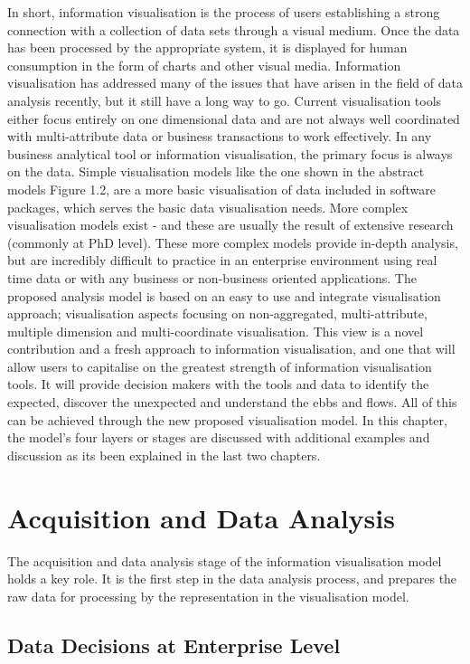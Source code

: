In short, information visualisation is the process of users establishing a strong connection with a collection of data sets through a visual medium. Once the data has been processed by the appropriate system, it is displayed for human consumption in the form of charts and other visual media. Information visualisation has addressed many of the issues that have arisen in the field of data analysis recently, but it still have a long way to go. Current visualisation tools either focus entirely on one dimensional data and are not always well coordinated with multi-attribute data or business transactions to  work effectively. In any business analytical tool or information visualisation, the primary focus is always on the data. Simple visualisation models like the one shown in the abstract models Figure 1.2, are a more basic visualisation of data included in software packages, which serves the basic data visualisation needs. More complex visualisation models exist - and these are usually the result of extensive research (commonly at PhD level). These more complex models provide in-depth analysis, but are incredibly difficult to practice in an enterprise environment using real time data or with any business or non-business oriented applications. The proposed analysis model is based on an easy to use and integrate visualisation approach; visualisation aspects focusing on non-aggregated, multi-attribute, multiple dimension and multi-coordinate visualisation. This view is a novel contribution and a fresh approach to information visualisation, and one that will allow users to capitalise on the greatest strength of information visualisation tools. It will provide decision makers with the tools and data to identify the expected, discover the unexpected and understand the ebbs and flows. All of this can be achieved through the new proposed visualisation model. In this chapter, the model's four layers or stages are discussed with additional examples and discussion as its been explained in the last two chapters.

\section{Acquisition and Data Analysis}

The acquisition and data analysis stage of the information visualisation model holds a key role. It is the first step in the data analysis process, and prepares the raw data for processing by the representation in the visualisation model.


\subsection{Data Decisions at Enterprise Level}


